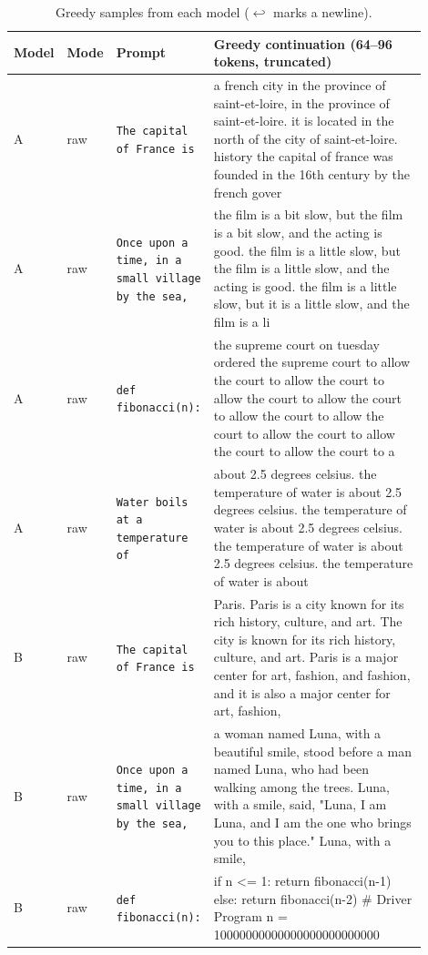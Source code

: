 \begin{longtable}{p{0.05\linewidth}p{0.05\linewidth}p{0.22\linewidth}p{0.58\linewidth}}
\caption{Greedy samples from each model ($\hookleftarrow$ marks a newline).}\label{tab:samples}\\
\toprule
Model & Mode & Prompt & Greedy continuation (64--96 tokens, truncated) \\
\midrule
\endhead
A & raw & \texttt{The capital of France is} & a french city in the province of saint-et-loire, in the province of saint-et-loire. it is located in the north of the city of saint-et-loire.    history  the capital of france was founded in the 16th century by the french gover \\
\midrule
A & raw & \texttt{Once upon a time, in a small village by the sea,} & the film is a bit slow, but the film is a bit slow, and the acting is good. the film is a little slow, but the film is a little slow, and the acting is good. the film is a little slow, but it is a little slow, and the film is a li \\
\midrule
A & raw & \texttt{def fibonacci(n):} & the supreme court on tuesday ordered the supreme court to allow the court to allow the court to allow the court to allow the court to allow the court to allow the court to allow the court to allow the court to allow the court to a \\
\midrule
A & raw & \texttt{Water boils at a temperature of} & about 2.5 degrees celsius.  the temperature of water is about 2.5 degrees celsius.  the temperature of water is about 2.5 degrees celsius.  the temperature of water is about 2.5 degrees celsius.  the temperature of water is about  \\
\midrule
B & raw & \texttt{The capital of France is} & Paris. Paris is a city known for its rich history, culture, and art. The city is known for its rich history, culture, and art. Paris is a major center for art, fashion, and fashion, and it is also a major center for art, fashion,  \\
\midrule
B & raw & \texttt{Once upon a time, in a small village by the sea,} & a woman named Luna, with a beautiful smile, stood before a man named Luna, who had been walking among the trees. Luna, with a smile, said, "Luna, I am Luna, and I am the one who brings you to this place." Luna, with a smile, \\
\midrule
B & raw & \texttt{def fibonacci(n):} &      if n <= 1:           return fibonacci(n-1)       else:           return fibonacci(n-2)     \# Driver Program   n = 10000000000000000000000000 \\

\end{longtable}
